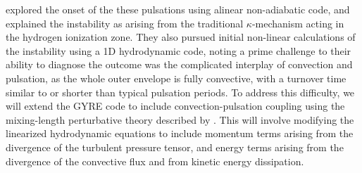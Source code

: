 \citet{1997AampA...327..224H} explored the onset of the these pulsations using alinear non-adiabatic code, and explained the instability  as arising from the traditional $\kappa$-mechanism acting in the hydrogen ionization zone. They also pursued initial
non-linear calculations of the instability using a 1D hydrodynamic code, noting a prime challenge to
their ability to diagnose the outcome was the complicated interplay of
convection and pulsation, as the whole outer envelope is fully
convective, with a turnover time similar to or shorter than typical pulsation periods. To address this difficulty, we will extend the GYRE code to include convection-pulsation coupling using the mixing-length perturbative theory described by \citet{Grigahcene:2005}. This will involve modifying the linearized hydrodynamic equations to include momentum terms arising from the divergence of the turbulent pressure tensor, and energy terms arising from the divergence of the convective flux and from kinetic energy dissipation.